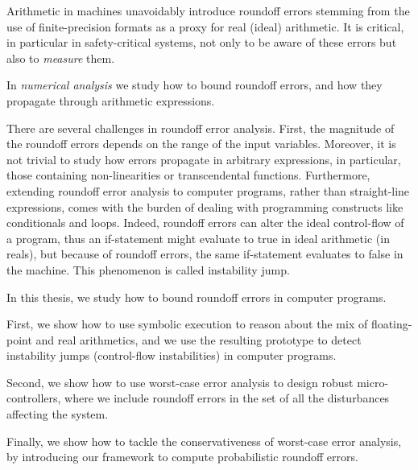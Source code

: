 %
Arithmetic in machines unavoidably introduce roundoff errors stemming from the use of finite-precision formats as a proxy for real (ideal) arithmetic. 
%
It is critical, in particular in safety-critical systems, not only to be aware of these errors but also to \emph{measure} them.
%

In \emph{numerical analysis} we study how to bound roundoff errors, and how they propagate through arithmetic expressions.
%

There are several challenges in roundoff error analysis. 
%
First, the magnitude of the roundoff errors depends on the range of the input variables. 
%
Moreover, it is not trivial to study how errors propagate in arbitrary expressions, in particular, those containing non-linearities or transcendental functions.
%
Furthermore, extending roundoff error analysis to computer programs, rather than straight-line expressions, comes with the burden of dealing with programming constructs like conditionals and loops. 
%
Indeed, roundoff errors can alter the ideal control-flow of a program, thus an if-statement might evaluate to true in ideal arithmetic (in reals), but because of roundoff errors, the same if-statement evaluates to false in the machine. 
%
This phenomenon is called instability jump.
%
%
%
%
%

In this thesis, we study how to bound roundoff errors in computer programs.

First, we show how to use symbolic execution to reason about the mix of floating-point and real arithmetics, and we use the resulting prototype to detect instability jumps (control-flow instabilities) in computer programs.
%

Second, we show how to use worst-case error analysis to design robust micro-controllers, where we include roundoff errors in the set of all the disturbances affecting the system.
%

Finally, we show how to tackle the conservativeness of worst-case error analysis, by introducing our framework to compute probabilistic roundoff errors.
